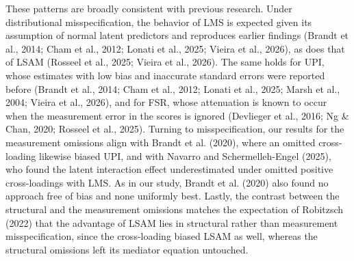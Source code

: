 \documentclass[
  man,
  longtable,
  nolmodern,
  notxfonts,
  notimes,
  colorlinks=true,linkcolor=blue,citecolor=blue,urlcolor=blue]{apa7}
\newcounter{none} %
\begin{document}
These patterns are broadly consistent with previous research. Under
distributional misspecification, the behavior of LMS is expected given
its assumption of normal latent predictors and reproduces earlier
findings (Brandt et al., 2014; Cham et al., 2012; Lonati et al., 2025;
Vieira et al., 2026), as does that of LSAM (Rosseel et al., 2025; Vieira
et al., 2026). The same holds for UPI, whose estimates with low bias and
inaccurate standard errors were reported before (Brandt et al., 2014;
Cham et al., 2012; Lonati et al., 2025; Marsh et al., 2004; Vieira et
al., 2026), and for FSR, whose attenuation is known to occur when the
measurement error in the scores is ignored (Devlieger et al., 2016; Ng
\& Chan, 2020; Rosseel et al., 2025). Turning to misspecification, our
results for the measurement omissions align with Brandt et al. (2020),
where an omitted cross-loading likewise biased UPI, and with Navarro and
Schermelleh-Engel (2025), who found the latent interaction effect
underestimated under omitted positive cross-loadings with LMS. As in our
study, Brandt et al. (2020) also found no approach free of bias and none
uniformly best. Lastly, the contrast between the structural and the
measurement omissions matches the expectation of Robitzsch (2022) that
the advantage of LSAM lies in structural rather than measurement
misspecification, since the cross-loading biased LSAM as well, whereas
the structural omissions left its mediator equation untouched.
\end{document}
